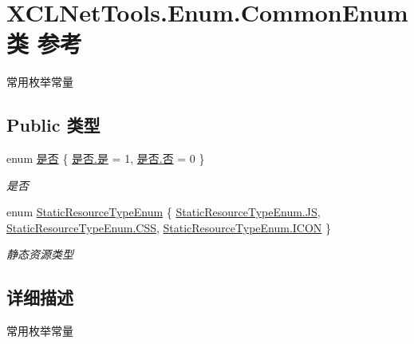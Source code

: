 \hypertarget{class_x_c_l_net_tools_1_1_enum_1_1_common_enum}{\section{X\-C\-L\-Net\-Tools.\-Enum.\-Common\-Enum类 参考}
\label{class_x_c_l_net_tools_1_1_enum_1_1_common_enum}
}


常用枚举常量  


\subsection*{Public 类型}
\begin{DoxyCompactItemize}
\item 
enum \hyperlink{class_x_c_l_net_tools_1_1_enum_1_1_common_enum_a5940e298dc09411c8a238f4f4e94e633}{是否} \{ \hyperlink{class_x_c_l_net_tools_1_1_enum_1_1_common_enum_a5940e298dc09411c8a238f4f4e94e633a0a60ac8f02ccd2cf723f927284877851}{是否.\-是} = 1, 
\hyperlink{class_x_c_l_net_tools_1_1_enum_1_1_common_enum_a5940e298dc09411c8a238f4f4e94e633ac9744f45e76d885ae1c74d4f4a934b2e}{是否.\-否} = 0
 \}
\begin{DoxyCompactList}\small\item\em 是否 \end{DoxyCompactList}\item 
enum \hyperlink{class_x_c_l_net_tools_1_1_enum_1_1_common_enum_abe6c6928080288df4a77ec8a59c537d1}{Static\-Resource\-Type\-Enum} \{ \hyperlink{class_x_c_l_net_tools_1_1_enum_1_1_common_enum_abe6c6928080288df4a77ec8a59c537d1a5bc06f5800d415cc95e1349edbaca425}{Static\-Resource\-Type\-Enum.\-J\-S}, 
\hyperlink{class_x_c_l_net_tools_1_1_enum_1_1_common_enum_abe6c6928080288df4a77ec8a59c537d1a2c56c360580420d293172f42d85dfbed}{Static\-Resource\-Type\-Enum.\-C\-S\-S}, 
\hyperlink{class_x_c_l_net_tools_1_1_enum_1_1_common_enum_abe6c6928080288df4a77ec8a59c537d1add912956b69fb3e570820021206968a3}{Static\-Resource\-Type\-Enum.\-I\-C\-O\-N}
 \}
\begin{DoxyCompactList}\small\item\em 静态资源类型 \end{DoxyCompactList}\end{DoxyCompactItemize}


\subsection{详细描述}
常用枚举常量 



